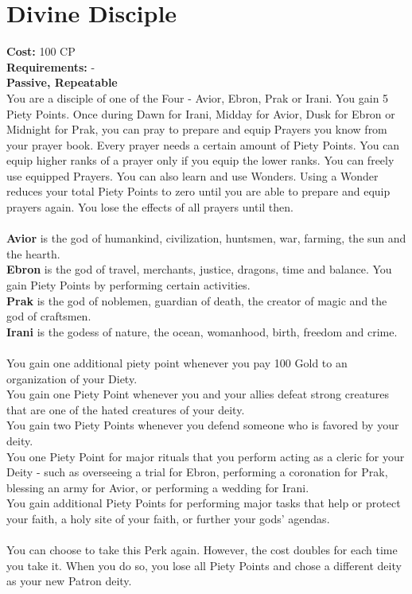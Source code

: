 \section{Divine Disciple}\label{perk:divineDisciple}
\textbf{Cost:} 100 CP\\
\textbf{Requirements:} - \\
\textbf{Passive, Repeatable}\\
You are a disciple of one of the Four - Avior, Ebron, Prak or Irani.
You gain 5 Piety Points.
Once during Dawn for Irani, Midday for Avior, Dusk for Ebron or Midnight for Prak, you can pray to prepare and equip Prayers you know from your prayer book.
Every prayer needs a certain amount of Piety Points.
You can equip higher ranks of a prayer only if you equip the lower ranks.
You can freely use equipped Prayers.
You can also learn and use Wonders.
Using a Wonder reduces your total Piety Points to zero until you are able to prepare and equip prayers again.
You lose the effects of all prayers until then.\\
\\
\textbf{Avior} is the god of humankind, civilization, huntsmen, war, farming, the sun and the hearth.\\
\textbf{Ebron} is the god of travel, merchants, justice, dragons, time and balance.
You gain Piety Points by performing certain activities.\\
\textbf{Prak} is the god of noblemen, guardian of death, the creator of magic and the god of craftsmen.\\
\textbf{Irani} is the godess of nature, the ocean, womanhood, birth, freedom and crime.\\
\\
You gain one additional piety point whenever you pay 100 Gold to an organization of your Diety.\\
You gain one Piety Point whenever you and your allies defeat strong creatures that are one of the hated creatures of your deity.\\
You gain two Piety Points whenever you defend someone who is favored by your deity.\\
You one Piety Point for major rituals that you perform acting as a cleric for your Deity - such as overseeing a trial for Ebron, performing a coronation for Prak, blessing an army for Avior, or performing a wedding for Irani.\\
You gain additional Piety Points for performing major tasks that help or protect your faith, a holy site of your faith, or further your gods' agendas.\\
\\
You can choose to take this Perk again.
However, the cost doubles for each time you take it.
When you do so, you lose all Piety Points and chose a different deity as your new Patron deity.